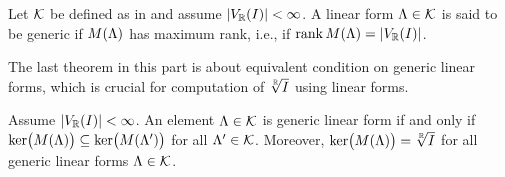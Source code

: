 \begin{definition}
  Let $\mathcal{K}$ be defined as in  and assume $|V_{\mathbb{R}}(I)|<\infty$.
  A linear form $\Lambda\in\mathcal{K}$ is said to be generic if $M(\Lambda)$ has maximum rank, i.e., if $\operatorname{rank}M(\Lambda) = |V_{\mathbb{R}}(I)|$.
\end{definition}

The last theorem in this part is about equivalent condition on generic linear forms, which is crucial for computation of $\sqrt[\mathbb{R}]{I}$ using linear forms.

\begin{theorem}
  Assume $|V_{\mathbb{R}}(I)|<\infty$.
  An element $\Lambda\in\mathcal{K}$ is generic linear form if and only if $\operatorname{ker}\!\big(M(\Lambda)\big)\subseteq \operatorname{ker}\!\big(M(\Lambda^\prime)\big)$ for all $\Lambda^\prime\in\mathcal{K}$.
  Moreover, $\operatorname{ker}\!\big(M(\Lambda)\big) = \sqrt[\mathbb{R}]{I}$ for all generic linear forms $\Lambda\in\mathcal{K}$.
\end{theorem}
